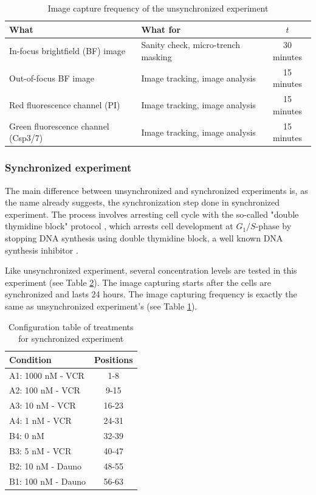\documentclass[pdftex,12pt,a4paper]{report}
\begin{document}
\begin{table}[H]
\centering
\begin{tabular}{| l | l | c |}
\hline
What & What for & $t$ \\
\hline
In-focus brightfield (BF) image & Sanity check, micro-trench masking & 30 minutes \\
Out-of-focus BF image & Image tracking, image analysis & 15 minutes \\
Red fluorescence channel (PI)& Image tracking, image analysis & 15 minutes \\
Green fluorescence channel (Csp3/7) & Image tracking, image analysis & 15 minutes \\
\hline
\end{tabular}
\caption{Image capture frequency of the unsynchronized experiment}
\label{table:image_capture_frequency}
\end{table}


\subsubsection*{Synchronized experiment}

The main difference between unsynchronized and synchronized experiments is, as the name already suggests, the synchronization step done in synchronized experiment. The process involves arresting cell cycle with the so-called "double thymidine block" protocol \cite{harper2005synchronization}, which arrests cell development at $G_1/S$-phase by stopping DNA synthesis using double thymidine block, a well known DNA synthesis inhibitor \cite{bostock1971evaluation}.

Like unsynchronized experiment, several concentration levels are tested in this experiment (see Table \ref{table:syn_treatments}). The image capturing starts after the cells are synchronized and lasts 24 hours. The image capturing frequency is exactly the same as unsynchronized experiment's (see Table \ref{table:image_capture_frequency}).

\begin{table}[H]
\centering
\begin{tabular}{| l | c |}
\hline
Condition & Positions \\
\hline
A1: 1000 nM - VCR & 1-8 \\
A2: 100 nM - VCR & 9-15 \\
A3: 10 nM - VCR & 16-23 \\
A4: 1 nM - VCR & 24-31 \\
B4: 0 nM & 32-39 \\
B3: 5 nM - VCR & 40-47 \\
B2: 10 nM - Dauno & 48-55 \\
B1: 100 nM - Dauno & 56-63 \\
\hline
\end{tabular}
\caption{Configuration table of treatments for synchronized experiment}
\label{table:syn_treatments}
\end{table}
\end{document}
